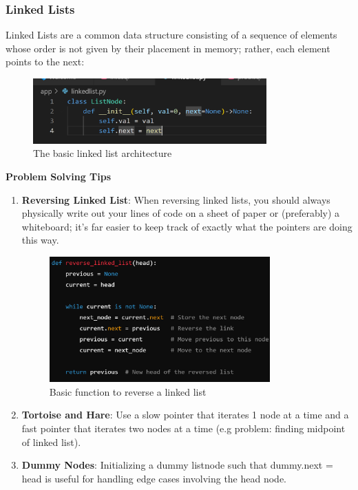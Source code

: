 \documentclass[12pt]{article}
\begin{document}
\subsubsection{Linked Lists}
Linked Lists are a common data structure consisting of a sequence of elements whose order is not given by their placement in memory; rather, each element points to the next:
\begin{figure}[H]
    \centering
    \includegraphics[width=0.8\textwidth]{./linked_list.png} %
    \caption{The basic linked list architecture}
\end{figure}
\textbf{Problem Solving Tips}
\begin{enumerate}
\item \textbf{Reversing Linked List}: When reversing linked lists, you should always physically write out your lines of code on a sheet of paper or (preferably) a whiteboard; it's far easier to keep track of exactly what the pointers are doing this way.
\begin{figure}[H]
    \centering
    \includegraphics[width=0.8\textwidth]{./reverse_linked_list.png} %
    \caption{Basic function to reverse a linked list}
\end{figure}
\item \textbf{Tortoise and Hare}: Use a slow pointer that iterates 1 node at a time and a fast pointer that iterates two nodes at a time (e.g problem: finding midpoint of linked list).
\item \textbf{Dummy Nodes}: Initializing a dummy listnode such that dummy.next = head is useful for handling edge cases involving the head node.
\end{enumerate}
\end{document}

